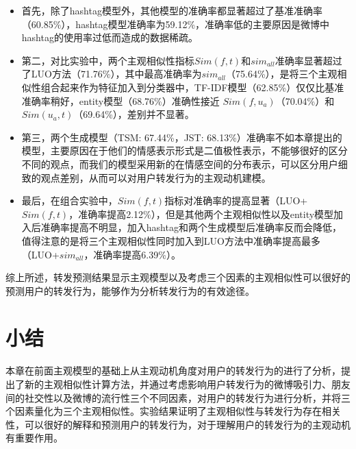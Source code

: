 \begin{itemize}
\item 首先，除了hashtag模型外，其他模型的准确率都显著超过了基准准确率（60.85\%），hashtag模型准确率为59.12\%，准确率低的主要原因是微博中hashtag的使用率过低而造成的数据稀疏。
\item 第二，对比实验中，两个主观相似性指标$ Sim(f,t) $和$ sim_{all}  $准确率显著超过了LUO方法（71.76\%），其中最高准确率为$ sim_{all}  $（75.64\%），是将三个主观相似性组合起来作为特征加入到分类器中，TF-IDF模型（62.85\%）仅仅比基准准确率稍好，entity模型（68.76\%）准确性接近 $ Sim(f,u_a)$（70.04\%）和$ Sim(u_a,t)  $（69.64\%），差别并不显著。
\item 第三，两个生成模型（TSM: 67.44\%，JST: 68.13\%）准确率不如本章提出的模型，主要原因在于他们的情感表示形式是二值极性表示，不能够很好的区分不同的观点，而我们的模型采用新的在情感空间的分布表示，可以区分用户细致的观点差别，从而可以对用户转发行为的主观动机建模。
\item 最后，在组合实验中，$ Sim(f,t) $指标对准确率的提高显著（LUO+$ Sim(f,t) $，准确率提高2.12\%），但是其他两个主观相似性以及entity模型加入后准确率提高不明显，加入hashtag和两个生成模型后准确率反而会降低，值得注意的是将三个主观相似性同时加入到LUO方法中准确率提高最多（LUO+$ sim_{all}  $，准确率提高6.39\%）。
\end{itemize}

综上所述，转发预测结果显示主观模型以及考虑三个因素的主观相似性可以很好的预测用户的转发行为，能够作为分析转发行为的有效途径。

\section{小结}
本章在前面主观模型的基础上从主观动机角度对用户的转发行为的进行了分析，提出了新的主观相似性计算方法，并通过考虑影响用户转发行为的微博吸引力、朋友间的社交性以及微博的流行性三个不同因素，对用户的转发行为进行分析，并将三个因素量化为三个主观相似性。实验结果证明了主观相似性与转发行为存在相关性，可以很好的解释和预测用户的转发行为，对于理解用户的转发行为的主观动机有重要作用。


